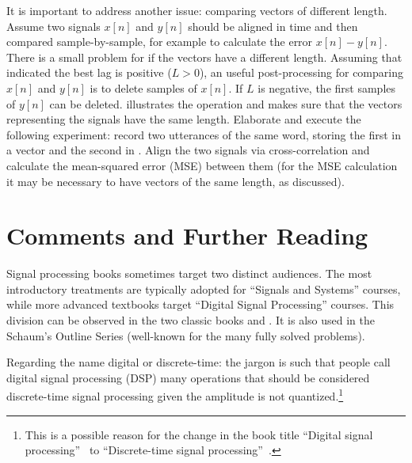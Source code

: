It is important to address another issue: comparing vectors of different length. Assume two signals $x[n]$ and  $y[n]$ should be aligned in time and then compared sample-by-sample, for example to calculate the error $x[n]-y[n]$. There is a small problem for {\matlab} if the vectors have a different length.
Assuming that  indicated the best lag is positive ($L>0$), an useful post-processing for comparing $x[n]$ and $y[n]$ is to delete samples of $x[n]$. If $L$ is negative, the first samples of $y[n]$ can be deleted.  illustrates the operation and makes sure that the vectors representing the signals have the same length.
Elaborate and execute the following experiment: record two utterances of the same word, storing the first in a vector  and the second in . Align the two signals via cross-correlation and calculate the mean-squared error (MSE) between them (for the MSE calculation it may be necessary to have vectors of the same length, as discussed).
\eApplication


\section{Comments and Further Reading}

Signal processing books sometimes target two distinct audiences. The most introductory treatments are typically adopted for ``Signals and Systems'' courses, while more advanced textbooks target ``Digital Signal Processing'' courses.
This division can be observed in the two classic books \cite{Oppenheim96} and \cite{Oppenheim09}. It is also used in the Schaum's Outline Series (well-known for the many fully solved problems).

Regarding the name digital or discrete-time: the jargon is such that people call digital signal processing (DSP) many operations that should be considered discrete-time signal processing given the amplitude is not quantized.\footnote{This is a possible reason for the change in the book title ``Digital signal processing''~\cite{Oppenheim75} to ``Discrete-time signal processing''~\cite{Oppenheim09}.} 

